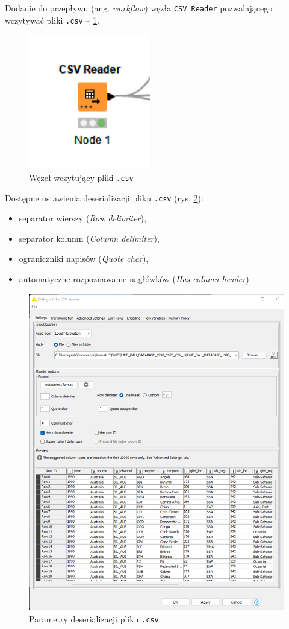 \documentclass[11pt]{report}
\begin{document}
Dodanie do przepływu (ang. \textit{workflow}) węzła \texttt{CSV Reader} pozwalającego wczytywać pliki \texttt{.csv} -- \ref{fig:csv_reader}.

\begin{figure}[h]
    \centering
    \includegraphics[width=.2\textwidth]{csv_reader.png}
    \caption{Węzeł wczytujący pliki \texttt{.csv}\label{fig:csv_reader}}
\end{figure}

Dostępne ustawienia deserializacji pliku \texttt{.csv} (rys. \ref{fig:csv_reader_2}):

\begin{itemize}
    \item separator wierszy (\textit{Row delimiter}),
    \item separator kolumn (\textit{Column delimiter}),
    \item ograniczniki napisów (\textit{Quote char}),
    \item automatyczne rozpoznawanie nagłówków (\textit{Has column header}).
\end{itemize}

\begin{figure}[h]
    \centering
    \includegraphics[width=.8\textwidth]{csv_reader_2.png}
    \caption{Parametry deserializacji pliku \texttt{.csv}\label{fig:csv_reader_2}}
\end{figure}
\end{document}
